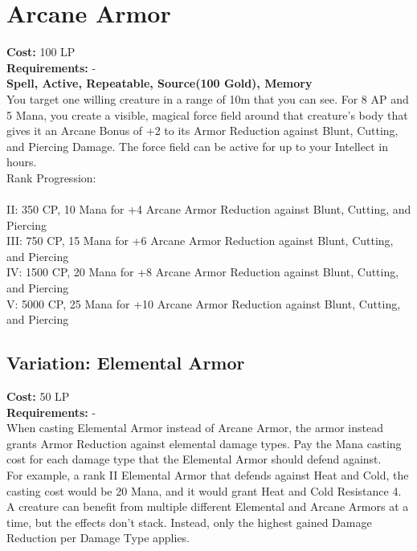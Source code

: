 \section{Arcane Armor}\label{spell:arcaneArmor}
\textbf{Cost:} 100 LP\\
\textbf{Requirements:} -\\
\textbf{Spell, Active, Repeatable, Source(100 Gold), Memory}\\
You target one willing creature in a range of 10m that you can see.
For 8 AP and 5 Mana, you create a visible, magical force field around that creature's body that gives it an Arcane Bonus of +2 to its Armor Reduction against Blunt, Cutting, and Piercing Damage.
The force field can be active for up to your Intellect in hours.
\\
Rank Progression:\\
\\
II: 350 CP, 10 Mana for +4 Arcane Armor Reduction against Blunt, Cutting, and Piercing\\
III: 750 CP, 15 Mana for +6 Arcane Armor Reduction against Blunt, Cutting, and Piercing\\
IV: 1500 CP, 20 Mana for +8 Arcane Armor Reduction against Blunt, Cutting, and Piercing\\
V: 5000 CP, 25 Mana for +10 Arcane Armor Reduction against Blunt, Cutting, and Piercing\\

\subsection{Variation: Elemental Armor}\label{spell:elementalArmor}
\textbf{Cost:} 50 LP\\
\textbf{Requirements:} -\\
When casting Elemental Armor instead of Arcane Armor, the armor instead grants Armor Reduction against elemental damage types.
Pay the Mana casting cost for each damage type that the Elemental Armor should defend against.\\
For example, a rank II Elemental Armor that defends against Heat and Cold, the casting cost would be 20 Mana, and it would grant Heat and Cold Resistance 4.\\
A creature can benefit from multiple different Elemental and Arcane Armors at a time, but the effects don't stack.
Instead, only the highest gained Damage Reduction per Damage Type applies.